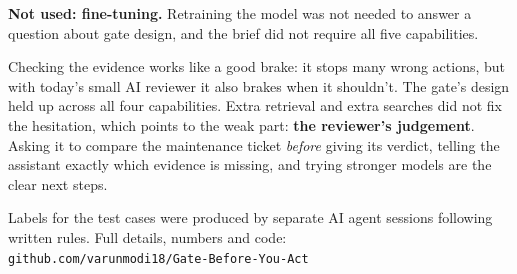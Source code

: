 \documentclass[10pt,a4paper]{article}
\newcommand{\head}[1]{\vspace{4pt}{\color{acc}\large\bfseries #1}\par\vspace{1pt}}
\begin{document}
\textbf{Not used: fine-tuning.} Retraining the model was not needed to answer a question about gate design, and the brief did not require all five capabilities.

\head{What it means}
Checking the evidence works like a good brake: it stops many wrong actions, but with today's small AI reviewer it also brakes when it shouldn't. The gate's design held up across all four capabilities. Extra retrieval and extra searches did not fix the hesitation, which points to the weak part: \textbf{the reviewer's judgement}. Asking it to compare the maintenance ticket \emph{before} giving its verdict, telling the assistant exactly which evidence is missing, and trying stronger models are the clear next steps.

\vfill
{\footnotesize Labels for the test cases were produced by separate AI agent sessions following written rules. Full details, numbers and code:\\ \texttt{github.com/varunmodi18/Gate-Before-You-Act}}
\end{document}
